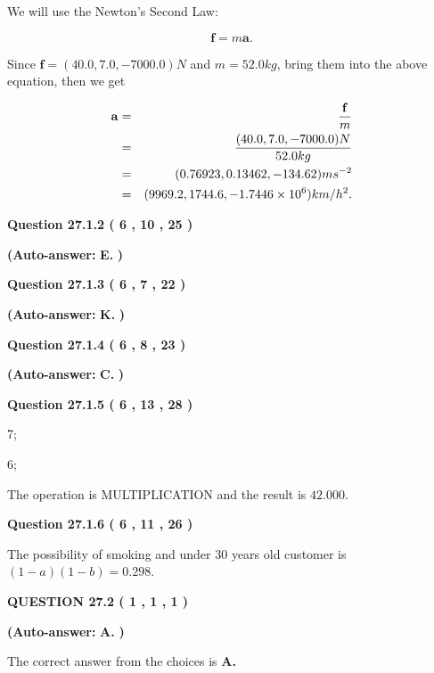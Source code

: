 \documentclass[12pt]{article}
\begin{document}
We will use the Newton's Second Law:
 
\[
\mathbf{f}=m\mathbf{a}.
\]
 
Since $\mathbf{f}=( %
40.0,  %
7.0,  %
-7000.0 )N$
and $m= %
52.0 kg$, bring them into the above equation, then we get
 
\begin{eqnarray*}
\mathbf{a}&=&\frac{\mathbf{f}}m  \\
&=&\frac{(
40.0 ,
7.0 ,
-7000.0 )N
}{ %
52.0 kg}  \\
&=&(
0.76923 ,
0.13462,
-134.62
)ms^{-2} \\
&=&(
9969.2 ,
1744.6 ,
-1.7446 \times 10^{6}
)km/h^2.
\end{eqnarray*}
 
  
  
{\textbf{\large{Question
27.1.2 
 (           6 ,          10 ,          25 )
}}}
 
 
{\textbf{(Auto-answer:}}
{\textbf{\large{
E.}}}
{\textbf{)}}
 
 
  
  
{\textbf{\large{Question
27.1.3 
 (           6 ,           7 ,          22 )
}}}
 
 
{\textbf{(Auto-answer:}}
{\textbf{\large{
K.}}}
{\textbf{)}}
 
 
  
  
{\textbf{\large{Question
27.1.4 
 (           6 ,           8 ,          23 )
}}}
 
 
{\textbf{(Auto-answer:}}
{\textbf{\large{
C.}}}
{\textbf{)}}
 
 
  
  
{\textbf{\large{Question
27.1.5 
 (           6 ,          13 ,          28 )
}}}

7;
 
6;
 
The operation is  %
MULTIPLICATION and the result is
$ %
42.000$.
 
  
  
{\textbf{\large{Question
27.1.6 
 (           6 ,          11 ,          26 )
}}}

The possibility of  %
smoking and  %
under 30 years old
customer is $ (1-a)(1-b) =  %
0.298 $.
  
  
{\textbf{\large{QUESTION
27.2 
 (           1 ,           1 ,           1 )
}}}
 
 
{\textbf{(Auto-answer:}}
{\textbf{\large{
A.}}}
{\textbf{)}}
 
 

The correct answer from the choices is
{\textbf{\large{
A.}}}
 
\end{document}
